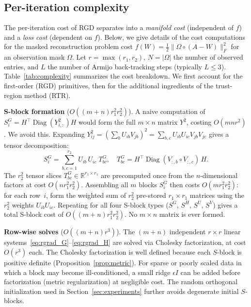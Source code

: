 \documentclass[letterpaper, 10 pt, conference]{ieeeconf}
\newcommand{\R}{\mathbb{R}}
\newcommand{\diag}{\operatorname{Diag}}
\newcommand{\Had}{\circ}
\theoremstyle{plain}
\theoremstyle{definition}
\theoremstyle{remark}
\newcommand{\BMmod}[1]{{\color{blue}#1}}%
\begin{document}
\subsection{Per-iteration complexity}
\label{sec:complexity}

The per-iteration cost of RGD separates into a \emph{manifold cost} (independent of $f$) and a \emph{loss cost} (dependent on $f$). Below, we give details of the cost computations for the masked reconstruction problem cost $f(W) = \frac{1}{2}\|\Omega\Had(A-W)\|_F^2$ for an observation mask $\Omega$. Let $r = \max(r_1,r_2)$, $N = |\Omega|$ the number of observed entries, and $L$ the number of Armijo back-tracking steps (typically $L\leq 3$). Table~\ref{tab:complexity} summarizes the cost breakdown. We first account for the first-order (RGD) primitives, then for the additional ingredients of the trust-region method (RTR).



\noindent\textbf{S-block formation} ($O((m{+}n)r_1^2 r_2^2)$).
A naive computation of $S_i^G = H^\top\diag(Y_{i,:}^2)H$ would form the full $m\times n$ matrix $Y^2$, costing $O(mnr^2)$. We avoid this. Expanding $Y_{ij}^2 = (\sum_b U_{ib}V_{jb})^2 = \sum_{b,c} U_{ib}U_{ic}V_{jb}V_{jc}$ gives a tensor decomposition:
\begin{equation}
  S_i^G = \sum_{b,c=1}^{r_2} U_{ib}\,U_{ic}\;T_{bc}^G,
  \quad T_{bc}^G = H^\top\diag(V_{:,b}\Had V_{:,c})\,H.
  \label{eq:tensor_sblock}
\end{equation}
The $r_2^2$ tensor slices $T_{bc}^G \in \R^{r_1\times r_1}$ are precomputed once from the $n$-dimensional factors at cost $O(nr_1^2 r_2^2)$.
Assembling all $m$ blocks $S_i^G$ then costs $O(mr_1^2 r_2^2)$: for each row~$i$, form the weighted sum of $r_2^2$ pre-stored $r_1{\times}r_1$ matrices using the $r_2^2$ weights $U_{ib}U_{ic}$.
Repeating for all four S-block types ($S^G$, $S^H$, $S^U$, $S^V$) gives a total S-block cost of $O((m{+}n)r_1^2 r_2^2)$.
No $m\times n$ matrix is ever formed. 

\noindent\textbf{Row-wise solves} ($O((m{+}n)r^3)$).
The $(m{+}n)$ independent $r\times r$ linear systems~\eqref{eq:rgrad_G}--\eqref{eq:rgrad_H} are solved via Cholesky factorization, at cost $O(r^3)$ each. 
The Cholesky factorization is well defined because each $S$-block is positive definite (Proposition~\ref{prop:metric}). For sparse or poorly scaled data in which a block may become ill-conditioned, a small ridge $\epsilon I$ can be added before factorization (metric regularization) at negligible cost. The random orthogonal initialization used in Section~\ref{sec:experiments} further avoids degenerate initial $S$-blocks.
\end{document}
